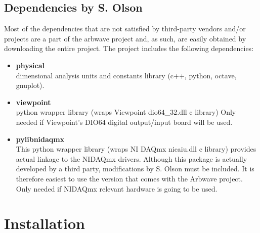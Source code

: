 \subsection{Dependencies by S. Olson}
Most of the dependencies that are not satisfied by third-party vendors and/or
projects are a part of the arbwave project and, as such, are easily obtained by
downloading the entire project.  The project includes the following
dependencies:
\begin{itemize}
\item \textbf{physical} \\
  dimensional analysis
  units and constants library (c++, python, octave, gnuplot).
\item \textbf{viewpoint} \\
  python wrapper library (wraps Viewpoint dio64\_32.dll c library)
  Only needed if Viewpoint's DIO64 digital output/input board will be used.
\item \textbf{pylibnidaqmx} \\
  This python wrapper library (wraps NI DAQmx nicaiu.dll c library) provides
  actual linkage to the NIDAQmx drivers.  Although this package is actually
  developed by a third party, modifications by S. Olson must be included.  It is
  therefore easiest to use the version that comes with the Arbwave project.
  Only needed if NIDAQmx relevant hardware is going to be used.
\end{itemize}

\section{Installation}

